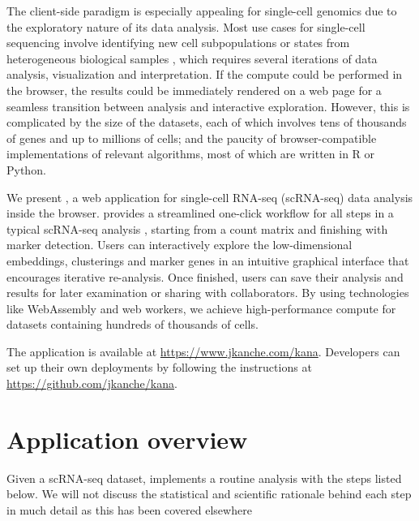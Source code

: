 \documentclass{article}
\begin{document}
The client-side paradigm is especially appealing for single-cell genomics due to the exploratory nature of its data analysis.
Most use cases for single-cell sequencing involve identifying new cell subpopulations or states from heterogeneous biological samples \cite{stegle2015computational},
which requires several iterations of data analysis, visualization and interpretation.
If the compute could be performed in the browser, the results could be immediately rendered on a web page for a seamless transition between analysis and interactive exploration.
However, this is complicated by the size of the datasets, each of which involves tens of thousands of genes and up to millions of cells;
and the paucity of browser-compatible implementations of relevant algorithms, most of which are written in R or Python.

We present , a web application for single-cell RNA-seq (scRNA-seq) data analysis inside the browser.
 provides a streamlined one-click workflow for all steps in a typical scRNA-seq analysis \cite{amezquita2020orchestrating}, 
starting from a count matrix and finishing with marker detection.
Users can interactively explore the low-dimensional embeddings, clusterings and marker genes in an intuitive graphical interface that encourages iterative re-analysis.
Once finished, users can save their analysis and results for later examination or sharing with collaborators.
By using technologies like WebAssembly and web workers, we achieve high-performance compute for datasets containing hundreds of thousands of cells.

The  application is available at \url{https://www.jkanche.com/kana}.
Developers can set up their own deployments by following the instructions at \url{https://github.com/jkanche/kana}.

\section{Application overview}

Given a scRNA-seq dataset,  implements a routine analysis with the steps listed below.
We will not discuss the statistical and scientific rationale behind each step in much detail as this has been covered elsewhere \cite{oscabook} 
\end{document}
